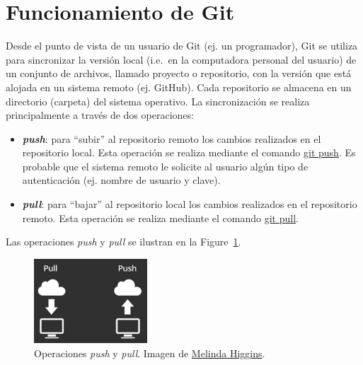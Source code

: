\documentclass[
  letterpaper,
  DIV=11,
  numbers=noendperiod]{scrreprt}
\providecommand{\tightlist}{%
  \setlength{\itemsep}{0pt}\setlength{\parskip}{0pt}}\usepackage{longtable,booktabs,array}
\begin{document}
\hypertarget{funcionamiento-de-git}{%
\section{Funcionamiento de Git}\label{funcionamiento-de-git}}

Desde el punto de vista de un usuario de Git (ej. un programador), Git
se utiliza para sincronizar la versión local (i.e.~en la computadora
personal del usuario) de un conjunto de archivos, llamado proyecto o
repositorio, con la versión que está alojada en un sistema remoto (ej.
GitHub). Cada repositorio se almacena en un directorio (carpeta) del
sistema operativo. La sincronización se realiza principalmente a través
de dos operaciones:

\begin{itemize}
\tightlist
\item
  \textbf{\emph{push}}: para ``subir'' al repositorio remoto los cambios
  realizados en el repositorio local. Esta operación se realiza mediante
  el comando \href{https://git-scm.com/docs/git-push}{git push}. Es
  probable que el sistema remoto le solicite al usuario algún tipo de
  autenticación (ej. nombre de usuario y clave).
\item
  \textbf{\emph{pull}}: para ``bajar'' al repositorio local los cambios
  realizados en el repositorio remoto. Esta operación se realiza
  mediante el comando \href{https://git-scm.com/docs/git-pull}{git
  pull}.
\end{itemize}

Las operaciones \emph{push} y \emph{pull} se ilustran en la
Figure~\ref{fig-git-push-pull}.

\begin{figure}

{\centering \includegraphics[width=1.67in,height=\textheight]{./img/git-push-pull.png}

}

\caption{\label{fig-git-push-pull}Operaciones \emph{push} y \emph{pull}.
Imagen de
\href{https://www.coursera.org/learn/reproducible-templates-analysis/lecture/NGbQv/git-and-github-part-1}{Melinda
Higgins}.}

\end{figure}
\end{document}
